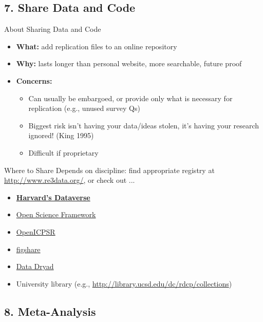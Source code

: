 \documentclass[12pt, compress, handout]{beamer}
\let\noteitem\item %
\renewcommand{\item}{ 
	\noteitem\vspace{\fill}
	}
\newcommand{\nb}[1]{{\color{burntorange} {#1}}}
\begin{document}
		
\subsection{7. Share Data and Code}

	\begin{frame}{About Sharing Data and Code}
		\begin{itemize}
			\item \textbf{What:} add replication files to an \nb{online repository}
			\item \textbf{Why:} lasts longer than personal website, more searchable, future proof
			\item \textbf{Concerns:} 
				\begin{itemize}
					\item Can usually be embargoed, or provide only what is necessary for replication (e.g., unused survey Qs)
					\item Biggest risk isn't having your data/ideas stolen, it's having your research ignored! (King 1995)
					\item Difficult if proprietary
				\end{itemize}
		\end{itemize}
	\end{frame}
	
	\begin{frame}{Where to Share}
		Depends on discipline: find appropriate registry at \url{http://www.re3data.org/}, or check out ... 
		\pause
		\begin{itemize}
			\item \textbf{\href{https://dataverse.harvard.edu/}{Harvard’s Dataverse} }
			\item \href{https://osf.io/}{Open Science Framework}
			\item \href{https://www.openicpsr.org/openicpsr/}{OpenICPSR}
			\item \href{https://figshare.com/}{figshare}
			\item \href{http://datadryad.org/}{Data Dryad}
			\item University library (e.g., \url{http://library.ucsd.edu/dc/rdcp/collections})
		\end{itemize}		
	\end{frame}


\subsection{8. Meta-Analysis}
	
\end{document}
